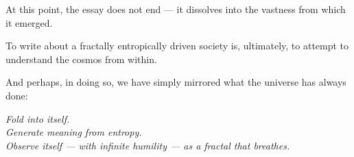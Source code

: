 At this point, the essay does not end — it dissolves into the vastness from which it emerged.

To write about a fractally entropically driven society is, ultimately, to attempt to understand the cosmos from within.

And perhaps, in doing so, we have simply mirrored what the universe has always done:

\textit{Fold into itself.\\
Generate meaning from entropy.\\
Observe itself — with infinite humility — as a fractal that breathes.}
